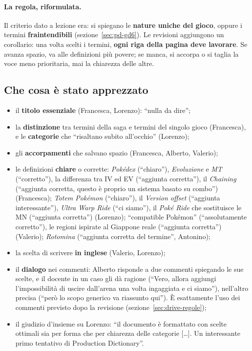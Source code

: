 \paragraph{La regola, riformulata.} Il criterio dato a lezione era: si
spiegano le \textbf{nature uniche del gioco}, oppure i termini
\textbf{fraintendibili} (sezione~\ref{sec:pd-gd6}). Le revisioni aggiungono un
corollario: una volta scelti i termini, \textbf{ogni riga della pagina deve
lavorare}. Se avanza spazio, va alle definizioni più povere; se manca, si
accorpa o si taglia la voce meno prioritaria, mai la chiarezza delle altre.

\subsection{Che cosa è stato apprezzato}
\label{rv:t2:sec:apprezzato}

\begin{itemize}
  \item il \textbf{titolo essenziale} (Francesca, Lorenzo): ``nulla da dire'';
  \item la \textbf{distinzione} tra termini della saga e termini del singolo
        gioco (Francesca), e le \textbf{categorie} che ``risaltano subito
        all'occhio'' (Lorenzo);
  \item gli \textbf{accorpamenti} che salvano spazio (Francesca, Alberto,
        Valerio);
  \item le definizioni \textbf{chiare} o corrette: \emph{Pokédex}
        (``chiaro''), \emph{Evoluzione} e \emph{MT} (``corretto''), la
        differenza tra IV ed EV (``aggiunta corretta''), il \emph{Chaining}
        (``aggiunta corretta, questo è proprio un sistema basato su combo'')
        (Francesca); \emph{Totem Pokémon} (``chiaro''), il \emph{Version
        offset} (``aggiunta interessante''), \emph{Ultra Warp Ride} (``ci
        siamo''), il \emph{Poké Ride} che sostituisce le MN (``aggiunta
        corretta'') (Lorenzo); ``compatible Pokémon'' (``assolutamente
        corretto''), le regioni ispirate al Giappone reale (``aggiunta
        corretta'') (Valerio); \emph{Rotomina} (``aggiunta corretta del
        termine'', Antonino);
  \item la scelta di scrivere \textbf{in inglese} (Valerio, Lorenzo);
  \item il \textbf{dialogo} nei commenti: Alberto risponde a due commenti
        spiegando le sue scelte, e il docente in un caso gli dà ragione
        (``Vero, allora aggiungi l'impossibilità di uscire dall'arena una volta
        ingaggiata e ci siamo''), nell'altro precisa (``però lo scopo generico
        va riassunto qui''). È esattamente l'uso dei commenti previsto dopo la
        revisione (sezione~\ref{sec:drive-regole});
  \item il giudizio d'insieme su Lorenzo: ``il documento è formattato con
        scelte ottimali sia per forma che per chiarezza delle categorie [\dots].
        Un interessante primo tentativo di Production Dictionary''.
\end{itemize}

